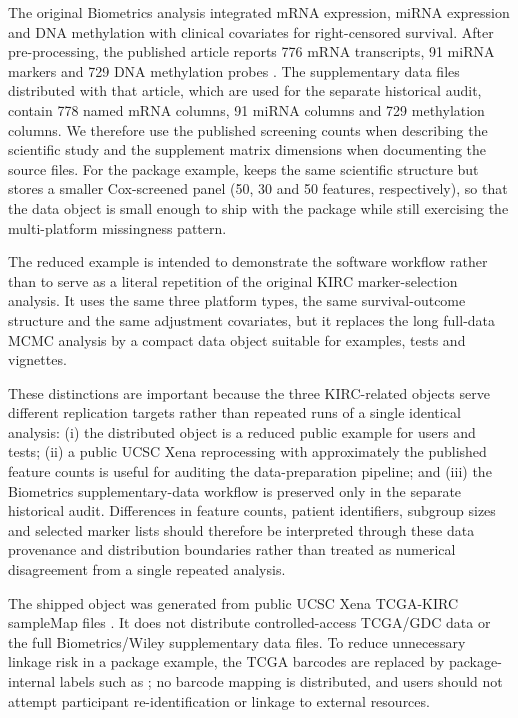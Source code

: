 \documentclass[article]{jss}
\begin{document}
The original Biometrics analysis integrated mRNA expression, miRNA expression
and DNA methylation with clinical covariates for right-censored survival.  After
pre-processing, the published article reports 776 mRNA transcripts, 91 miRNA
markers and 729 DNA methylation probes \citep{chekouo2017}.  The supplementary
 data files distributed with that article, which are used for the
separate historical audit, contain 778 named
mRNA columns, 91 miRNA columns and 729 methylation columns.  We therefore use
the published screening counts when describing the scientific study and the
supplement matrix dimensions when documenting the source files.  For the
package example,  keeps the same scientific structure but stores
a smaller Cox-screened panel (50, 30 and 50 features, respectively), so that the
data object is small enough to ship with the package while still exercising the
multi-platform missingness pattern.

The reduced example is intended to demonstrate the software workflow rather
than to serve as a literal repetition of the original KIRC marker-selection
analysis.  It uses the same three platform types, the same survival-outcome
structure and the same adjustment covariates, but it replaces the long
full-data MCMC analysis by a compact data object suitable for examples, tests
and vignettes.

These distinctions are important because the three KIRC-related objects serve
different replication targets rather than repeated runs of a single identical
analysis: (i) the distributed  object is a reduced public example
for users and tests; (ii) a public UCSC Xena reprocessing with approximately the
published feature counts is useful for auditing the data-preparation pipeline;
and (iii) the Biometrics supplementary-data workflow is preserved only in the
separate historical audit.  Differences in
feature counts, patient identifiers, subgroup sizes and selected marker lists
should therefore be interpreted through these data provenance and distribution
boundaries rather than treated as numerical disagreement from a single
repeated analysis.

The shipped object was generated from public UCSC Xena TCGA-KIRC sampleMap
files \citep{tcgaKirc2013,gdcPortal,goldman2020}.  It does not distribute
controlled-access TCGA/GDC data or the full Biometrics/Wiley supplementary data
files.  To reduce unnecessary linkage risk in a package example, the TCGA
barcodes are replaced by package-internal labels such as ; no
barcode mapping is distributed, and users should not attempt participant
re-identification or linkage to external resources.
\end{document}
